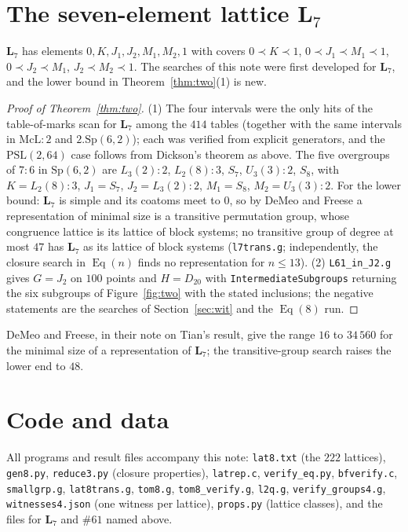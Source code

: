 \documentclass[11pt]{article}
\theoremstyle{remark}
\newcommand{\Eq}{\operatorname{Eq}}
\newcommand{\LL}{\mathbf{L}_7}
\newcommand{\lat}[1]{\##1}
\begin{document}
\section{The seven-element lattice $\LL$}\label{sec:L7}

$\LL$ has elements $0,K,J_1,J_2,M_1,M_2,1$ with covers
$0\prec K\prec 1$, $0\prec J_1\prec M_1\prec 1$, $0\prec J_2\prec M_1$, $J_2\prec M_2\prec 1$.
The searches of this note were first developed for $\LL$, and the lower bound in
Theorem~\ref{thm:two}(1) is new.

\begin{proof}[Proof of Theorem~\ref{thm:two}]
(1) The four intervals were the only hits of the table-of-marks scan for $\LL$ among the $414$
tables (together with the same intervals in $\mathrm{McL}{:}2$ and $2.\mathrm{Sp}(6,2)$); each was
verified from explicit generators, and the $\mathrm{PSL}(2,64)$ case follows from Dickson's theorem
as above. The five overgroups of $7{:}6$ in $\mathrm{Sp}(6,2)$ are $L_3(2){:}2$, $L_2(8){:}3$, $S_7$,
$U_3(3){:}2$, $S_8$, with $K=L_2(8){:}3$, $J_1=S_7$, $J_2=L_3(2){:}2$, $M_1=S_8$, $M_2=U_3(3){:}2$.
For the lower bound: $\LL$ is simple and its coatoms meet to $0$, so by DeMeo and Freese
\cite{DeMeoFreese} a representation of minimal size is a transitive permutation group, whose
congruence lattice is its lattice of block systems; no transitive group of degree at most $47$ has
$\LL$ as its lattice of block systems (\texttt{l7trans.g}; independently, the closure search in
$\Eq(n)$ finds no representation for $n\le 13$).
(2) \texttt{L61\_in\_J2.g} gives $G=J_2$ on $100$ points and $H=D_{20}$ with
\texttt{IntermediateSubgroups} returning the six subgroups of Figure~\ref{fig:two} with the stated
inclusions; the negative statements are the searches of Section~\ref{sec:wit} and the $\Eq(8)$ run.
\end{proof}

DeMeo and Freese, in their note on Tian's result, give the range $16$ to $34\,560$ for the minimal
size of a representation of $\LL$; the transitive-group search raises the lower end to $48$.

\section*{Code and data}
All programs and result files accompany this note: \texttt{lat8.txt} (the $222$ lattices),
\texttt{gen8.py}, \texttt{reduce3.py} (closure properties), \texttt{latrep.c}, \texttt{verify\_eq.py},
\texttt{bfverify.c}, \texttt{smallgrp.g}, \texttt{lat8trans.g}, \texttt{tom8.g}, \texttt{tom8\_verify.g},
\texttt{l2q.g}, \texttt{verify\_groups4.g}, \texttt{witnesses4.json} (one witness per lattice),
\texttt{props.py} (lattice classes), and the files for $\LL$ and $\lat{61}$ named above.
\end{document}
